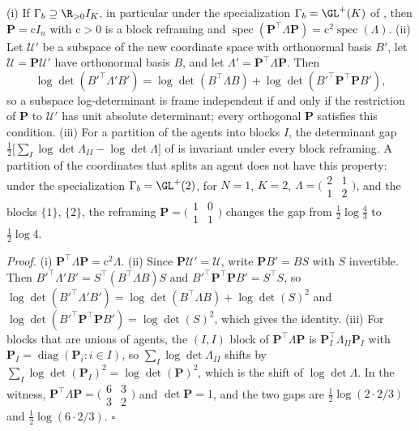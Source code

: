 (i) If \(\Gamma_b\supseteq\R_{>0}I_K\), in particular under the specialization
\(\Gamma_b=\GL^+(K)\) of , then \(\mathbf P=\mathrm cI_n\) with \(\mathrm c>0\)
is a block reframing and \(\operatorname{spec}(\mathbf P^\top\Lambda \mathbf P)=\mathrm c^2\operatorname{spec}(\Lambda)\).
(ii) Let \(\mathcal U'\) be a subspace of the new coordinate space with orthonormal basis
\(B'\), let \(\mathcal U=\mathbf P\mathcal U'\) have orthonormal basis \(B\), and let \(\Lambda'=\mathbf P^\top\Lambda \mathbf P\).
Then
\begin{equation}
\log\det\left(B'^\top\Lambda'B'\right)
=\log\det\left(B^\top\Lambda B\right)+\log\det\left(B'^\top \mathbf P^\top \mathbf PB'\right),
\label{eq:ig-logdet-law}
\end{equation}
so a subspace log-determinant is frame independent if and only if the restriction
of \(\mathbf P\) to \(\mathcal U'\) has unit absolute determinant; every orthogonal \(\mathbf P\) satisfies
this condition.
(iii) For a partition of the agents into blocks \(I\), the determinant gap
\(\tfrac12\bigl[\sum_I\log\det\Lambda_{II}-\log\det\Lambda\bigr]\) of
 is invariant under every block reframing. A
partition of the coordinates that splits an agent does not have this property: under
the specialization \(\Gamma_b=\GL^+(2)\), for \(N=1\), \(K=2\),
\(\Lambda=\bigl(\begin{smallmatrix}2&1\\1&2\end{smallmatrix}\bigr)\), and the blocks
\(\{1\}\), \(\{2\}\), the reframing
\(\mathbf P=\bigl(\begin{smallmatrix}1&0\\1&1\end{smallmatrix}\bigr)\) changes the gap from
\(\tfrac12\log\tfrac43\) to \(\tfrac12\log4\). 

\noindent\emph{Proof.}
(i) \(\mathbf P^\top\Lambda \mathbf P=\mathrm c^2\Lambda\). (ii) Since \(\mathbf P\mathcal U'=\mathcal U\), write \(\mathbf PB'=BS\)
with \(S\) invertible. Then \(B'^\top\Lambda'B'=S^\top(B^\top\Lambda B)S\) and
\(B'^\top \mathbf P^\top \mathbf PB'=S^\top S\), so
\(\log\det(B'^\top\Lambda'B')=\log\det(B^\top\Lambda B)+\log\det(S)^2\) and
\(\log\det(B'^\top \mathbf P^\top \mathbf PB')=\log\det(S)^2\), which gives the identity. (iii) For blocks
that are unions of agents, the \((I,I)\) block of \(\mathbf P^\top\Lambda \mathbf P\) is
\(\mathbf P_I^\top\Lambda_{II}\mathbf P_I\) with \(\mathbf P_I=\operatorname{diag}(\mathbf P_i:i\in I)\), so
\(\sum_I\log\det\Lambda_{II}\) shifts by \(\sum_I\log\det(\mathbf P_I)^2=\log\det(\mathbf P)^2\), which
is the shift of \(\log\det\Lambda\). In the witness,
\(\mathbf P^\top\Lambda \mathbf P=\bigl(\begin{smallmatrix}6&3\\3&2\end{smallmatrix}\bigr)\) and
\(\det \mathbf P=1\), and the two gaps are \(\tfrac12\log(2\cdot2/3)\) and
\(\tfrac12\log(6\cdot2/3)\). \hfill$\square$

